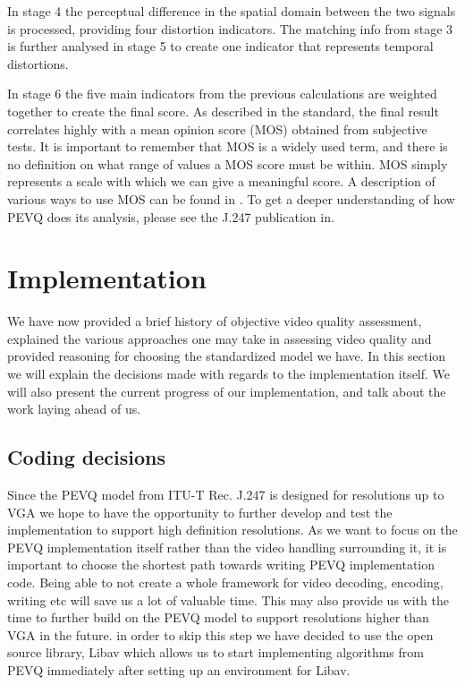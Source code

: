 In stage 4 the perceptual difference in the spatial domain between the two signals is processed, providing four distortion indicators. The matching info from stage 3 is further analysed in stage 5 to create one indicator that represents temporal distortions. 

In stage 6 the five main indicators from the previous calculations are weighted together to create the final score. As described in the standard, the final result correlates highly with a mean opinion score (MOS) obtained from subjective tests. It is important to remember that MOS is a widely used term, and there is no definition on what range of values a MOS score must be within. MOS simply represents a scale with which we can give a meaningful score. A description of various ways to use MOS can be found in \cite{p800}. To get a deeper understanding of how PEVQ does its analysis, please see the J.247 publication in\cite{j.247}.

\section{Implementation}\label{sect:implementation}
We have now provided a brief history of objective video quality assessment, explained the various approaches one may take in assessing video quality and provided reasoning for choosing the standardized model we have. In this section we will explain the decisions made with regards to the implementation itself. We will also present the current progress of our implementation, and talk about the work laying ahead of us.

\subsection{Coding decisions}\label{sect:coding}
Since the PEVQ model from ITU-T Rec. J.247 is designed for resolutions up to VGA we hope to have the opportunity to further develop and test the implementation to support high definition resolutions. 
As we want to focus on the PEVQ implementation itself rather than the video handling surrounding it, it is important to choose the shortest path towards writing PEVQ implementation code. Being able to not create a whole framework for video decoding, encoding, writing etc will save us a lot of valuable time. This may also provide us with the time to further build on the PEVQ model to support resolutions higher than VGA in the future. in order to skip this step we have decided to use the open source library, Libav\cite{libav} which allows us to start implementing algorithms from PEVQ immediately after setting up an environment for Libav.

